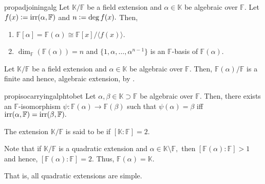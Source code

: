 \begin{restatable}[]{prop}{adjoiningalg}
\label{prop:adjoiningalg}
    Let $\mathbb{K}/\mathbb{F}$ be a field extension and $\alpha \in \mathbb{K}$ be algebraic over $\mathbb{F}.$ Let $f(x) \vcentcolon= \operatorname{irr}(\alpha, \mathbb{F})$ and $n \vcentcolon= \deg f(x).$ Then,
    \begin{enumerate}
         \item $\mathbb{F}[\alpha] = \mathbb{F}(\alpha) \cong \mathbb{F}[x]/\langle f(x)\rangle.$
         \item $\dim_{\mathbb{F}}(\mathbb{F}(\alpha)) = n$ and $\{1, \alpha, \ldots, \alpha^{n - 1}\}$ is an $\mathbb{F}$-basis of $\mathbb{F}(\alpha).$ \hfill\hyperref[prop:adjoiningalg2]{\downsym}
     \end{enumerate} 
\end{restatable}

\begin{cor} \label{cor:adjoinalgisfin}
    Let $\mathbb{K}/\mathbb{F}$ be a field extension and $\alpha \in \mathbb{K}$ be algebraic over $\mathbb{F}.$ Then, $\mathbb{F}(\alpha)/\mathbb{F}$ is a finite and hence, algebraic extension, by .
\end{cor}

\begin{restatable}[]{prop}{isocarryingalphtobet}
\label{prop:isocarryingalphtobet}
    Let $\alpha, \beta \in \mathbb{K} \supset \mathbb{F}$ be algebraic over $\mathbb{F}.$ Then, there exists an $\mathbb{F}$-isomorphism $\psi : \mathbb{F}(\alpha) \to \mathbb{F}(\beta)$ such that $\psi(\alpha) = \beta$ iff $\operatorname{irr}(\alpha, \mathbb{F}) = \operatorname{irr}(\beta, \mathbb{F}).$ \hfill\hyperref[prop:isocarryingalphtobet2]{\downsym}
\end{restatable}

\begin{defn}%
    The extension $\mathbb{K}/\mathbb{F}$ is said to be  if $[\mathbb{K} : \mathbb{F}] = 2.$
\end{defn}

\begin{rem}
    Note that if $\mathbb{K}/\mathbb{F}$ is a quadratic extension and $\alpha \in \mathbb{K}\setminus\mathbb{F},$ then $[\mathbb{F}(\alpha) : \mathbb{F}] > 1$ and hence, $[\mathbb{F}(\alpha) : \mathbb{F}] = 2.$ Thus, $\mathbb{F}(\alpha) = \mathbb{K}.$

    That is, all quadratic extensions are simple.
\end{rem}

